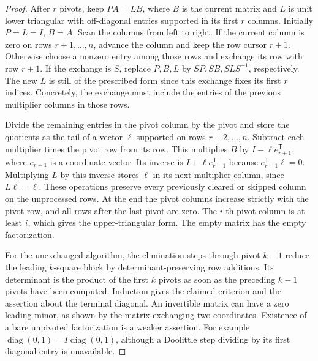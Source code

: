\documentclass[11pt,oneside,openany]{book}
\theoremstyle{plain}
\theoremstyle{definition}
\theoremstyle{remark}
\begin{document}
\begin{proof}
After \(r\) pivots, keep \(PA=LB\), where \(B\) is the current matrix
and \(L\) is unit lower triangular with off-diagonal entries supported
in its first \(r\) columns. Initially \(P=L=I\), \(B=A\). Scan the
columns from left to right. If the current column is zero on rows
\(r+1,\ldots,n\), advance the column and keep the row cursor \(r+1\).
Otherwise choose a nonzero entry among those rows and exchange its
row with row \(r+1\). If the exchange is \(S\), replace \(P,B,L\)
by \(SP,SB,SLS^{-1}\), respectively. The new \(L\) is still of the
prescribed form since this exchange fixes its first \(r\) indices.
Concretely, the exchange must include the entries of the previous
multiplier columns in those rows.

Divide the remaining entries in the pivot column by the pivot and
store the quotients as the tail of a vector \(\ell\) supported on
rows \(r+2,\ldots,n\). Subtract each multiplier times the pivot row
from its row. This multiplies \(B\) by \(I-\ell e_{r+1}^{\mathsf T}\),
where \(e_{r+1}\) is a coordinate vector. Its inverse is
\(I+\ell e_{r+1}^{\mathsf T}\) because \(e_{r+1}^{\mathsf T}\ell=0\).
Multiplying \(L\) by this inverse stores \(\ell\) in its next multiplier column,
since \(L\ell=\ell\). These operations preserve every previously
cleared or skipped column on the unprocessed rows. At the end the
pivot columns increase strictly with the pivot row, and all rows
after the last pivot are zero. The \(i\)-th pivot column is at
least \(i\), which gives the upper-triangular form. The empty matrix
has the empty factorization.

For the unexchanged algorithm, the elimination steps through
pivot \(k-1\) reduce the leading \(k\)-square block by
determinant-preserving row additions. Its determinant is
the product of the first \(k\) pivots as soon as the preceding
\(k-1\) pivots have been computed. Induction gives the claimed
criterion and the assertion about the terminal diagonal. An
invertible matrix can have a zero leading minor, as shown by
the matrix exchanging two coordinates. Existence of a bare
unpivoted factorization is a weaker assertion. For example
\(\operatorname{diag}(0,1)=I\operatorname{diag}(0,1)\), although a
Doolittle step dividing by its first diagonal entry is unavailable.
\end{proof}
\end{document}
